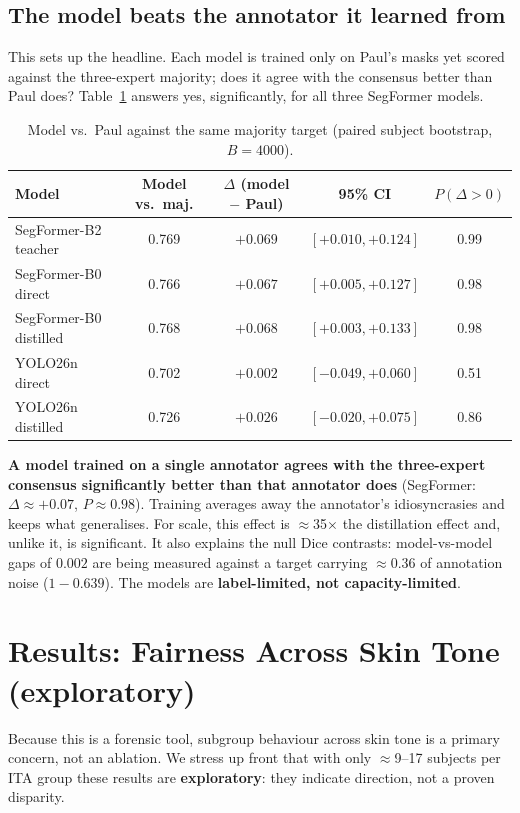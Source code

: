 \documentclass[11pt]{article}
\begin{document}
\subsection{The model beats the annotator it learned from}
This sets up the headline. Each model is trained only on Paul's masks yet scored
against the three-expert majority; does it agree with the consensus better than
Paul does? Table~\ref{tab:paul} answers yes, significantly, for all three
SegFormer models.

\begin{table}[h]
\centering
\caption{Model vs.\ Paul against the same majority target
(paired subject bootstrap, $B=4000$).}
\label{tab:paul}
\begin{tabular}{lcccc}
\toprule
Model & Model vs.\ maj. & $\Delta$ (model $-$ Paul) & 95\% CI & $P(\Delta{>}0)$ \\
\midrule
SegFormer-B2 teacher   & 0.769 & $+0.069$ & $[+0.010, +0.124]$ & 0.99 \\
SegFormer-B0 direct    & 0.766 & $+0.067$ & $[+0.005, +0.127]$ & 0.98 \\
SegFormer-B0 distilled & 0.768 & $+0.068$ & $[+0.003, +0.133]$ & 0.98 \\
YOLO26n direct         & 0.702 & $+0.002$ & $[-0.049, +0.060]$ & 0.51 \\
YOLO26n distilled      & 0.726 & $+0.026$ & $[-0.020, +0.075]$ & 0.86 \\
\bottomrule
\end{tabular}
\end{table}

\textbf{A model trained on a single annotator agrees with the three-expert
consensus significantly better than that annotator does} (SegFormer:
$\Delta\approx+0.07$, $P\approx0.98$). Training averages away the annotator's
idiosyncrasies and keeps what generalises. For scale, this effect is
$\approx$35$\times$ the distillation effect and, unlike it, is significant. It
also explains the null Dice contrasts: model-vs-model gaps of $0.002$ are being
measured against a target carrying $\approx$0.36 of annotation noise
($1-0.639$). The models are \textbf{label-limited, not capacity-limited}.

\section{Results: Fairness Across Skin Tone (exploratory)}
\label{sec:fairness}
Because this is a forensic tool, subgroup behaviour across skin tone is a primary
concern, not an ablation. We stress up front that with only $\approx$9--17
subjects per ITA group these results are \textbf{exploratory}: they indicate
direction, not a proven disparity.
\end{document}
